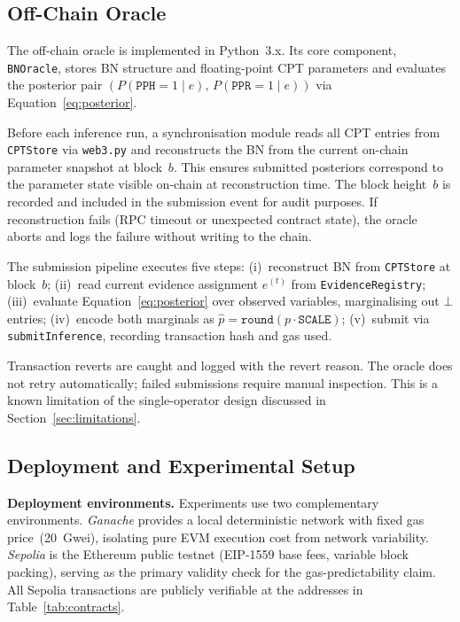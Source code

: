\documentclass[journal]{IEEEtran}
\begin{document}
\subsection{Off-Chain Oracle}

The off-chain oracle is implemented in Python~3.x.
Its core component, \texttt{BNOracle}, stores BN
structure and floating-point CPT parameters and
evaluates the posterior pair
$(P(\texttt{PPH}=1\mid e),\,P(\texttt{PPR}=1\mid e))$
via Equation~\eqref{eq:posterior}.

Before each inference run, a synchronisation module
reads all CPT entries from \texttt{CPTStore} via
\texttt{web3.py} and reconstructs the BN from the
current on-chain parameter snapshot at block~$b$.
This ensures submitted posteriors correspond to the
parameter state visible on-chain at reconstruction
time. The block height~$b$ is recorded and included
in the submission event for audit purposes. If
reconstruction fails (RPC timeout or unexpected
contract state), the oracle aborts and logs the
failure without writing to the chain.

The submission pipeline executes five steps:
(i)~reconstruct BN from \texttt{CPTStore} at block~$b$;
(ii)~read current evidence assignment $e^{(t)}$ from
\texttt{EvidenceRegistry};
(iii)~evaluate Equation~\eqref{eq:posterior} over
observed variables, marginalising out $\bot$ entries;
(iv)~encode both marginals as
$\widehat{p}=\texttt{round}(p\cdot\texttt{SCALE})$;
(v)~submit via \texttt{submitInference}, recording
transaction hash and gas used.

Transaction reverts are caught and logged with the
revert reason. The oracle does not retry automatically;
failed submissions require manual inspection. This is
a known limitation of the single-operator design
discussed in Section~\ref{sec:limitations}.

\subsection{Deployment and Experimental Setup}

\textbf{Deployment environments.}
Experiments use two complementary environments.
\emph{Ganache} provides a local deterministic network
with fixed gas price~(20~Gwei), isolating pure EVM
execution cost from network variability.
\emph{Sepolia} is the Ethereum public testnet
(EIP-1559 base fees, variable block packing), serving
as the primary validity check for the
gas-predictability claim. All Sepolia transactions are
publicly verifiable at the addresses in
Table~\ref{tab:contracts}.
\end{document}
